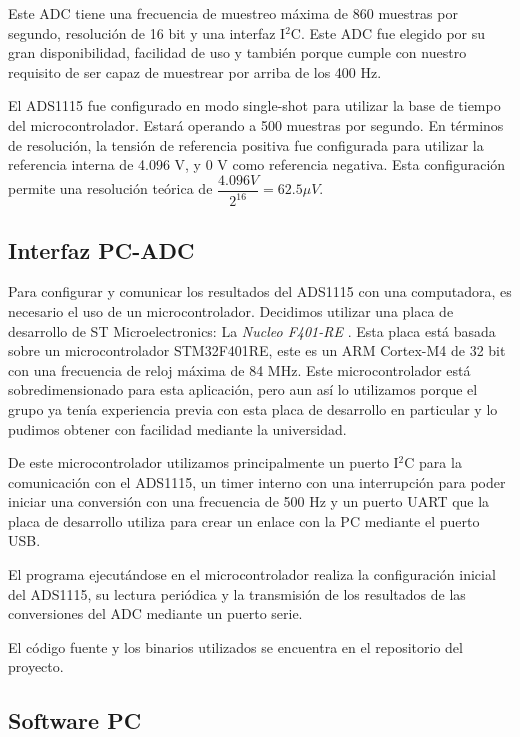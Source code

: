 \documentclass[conference]{IEEEtran}
\begin{document}
Este ADC tiene una frecuencia de muestreo máxima de 860 muestras por segundo, resolución
de 16 bit y una interfaz I$^2$C. Este ADC fue elegido por su gran disponibilidad,
facilidad de uso y también porque cumple con nuestro requisito de ser capaz de
muestrear por arriba de los 400 Hz.

El ADS1115 fue configurado en modo single-shot para utilizar la
base de tiempo del microcontrolador. Estará operando a 500 muestras por
segundo. En términos de resolución, la tensión de referencia positiva fue configurada
para utilizar la referencia interna de 4.096 V, y 0 V como referencia negativa.
Esta configuración permite una resolución teórica de $\dfrac{4.096 V}{2^{16}} = 
62.5 \mu V$.

\subsection{Interfaz PC-ADC}

Para configurar y comunicar los resultados del ADS1115 con una computadora, es
necesario el uso de un microcontrolador. Decidimos utilizar una placa de desarrollo 
de ST Microelectronics: La \textit{Nucleo F401-RE} \cite{nucleo}. Esta placa está
basada sobre un microcontrolador STM32F401RE, este es un ARM Cortex-M4 de 32 bit
con una frecuencia de reloj máxima de 84 MHz. Este microcontrolador está
sobredimensionado para esta aplicación, pero aun así lo utilizamos porque el
grupo ya tenía experiencia previa con esta placa de desarrollo en particular y lo
pudimos obtener con facilidad mediante la universidad.

De este microcontrolador utilizamos principalmente un puerto I$^2$C para la
comunicación con el ADS1115, un timer interno con una interrupción para poder
iniciar una conversión con una frecuencia de 500 Hz y un puerto UART que la placa
de desarrollo utiliza para crear un enlace con la PC mediante el puerto USB.

El programa ejecutándose en el microcontrolador realiza la configuración inicial del
ADS1115, su lectura periódica y la transmisión de los resultados de las conversiones
del ADC mediante un puerto serie.

El código fuente y los binarios utilizados se encuentra en el repositorio del
proyecto. \cite{repository} 

\subsection{Software PC}\label{software-pc}
\end{document}
